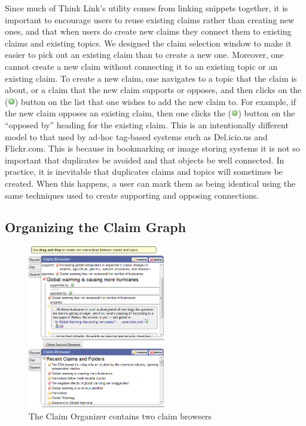 \documentclass{chi2009}
\begin{document}
Since much of Think Link's utility comes from linking snippets together, it is important to encourage users to reuse existing claims rather than creating new ones, and that when users do create new claims they connect them to existing claims and existing topics. We designed the claim selection window to make it easier to pick out an existing claim than to create a new one. Moreover, one cannot create a new claim without connecting it to an existing topic or an existing claim. To create a new claim, one navigates to a topic that the claim is about, or a claim that the new claim supports or opposes, and then clicks on the (\includegraphics[width=0.3cm]{../images/add.png}) button on the list that one wishes to add the new claim to. For example, if the new claim opposes an existing claim, then one clicks the (\includegraphics[width=0.3cm]{../images/add.png}) button on the ``opposed by'' heading for the existing claim. This is an intentionally different model to that used by ad-hoc tag-based systems such as Del.icio.us and Flickr.com. This is because in bookmarking or image storing systems it is not so important that duplicates be avoided and that objects be well connected. In practice, it is inevitable that duplicates claims and topics will sometimes be created. When this happens, a user can mark them as being identical using the same techniques used to create supporting and opposing connections.


\subsection{Organizing the Claim Graph}

\begin{figure}[tb]
	\begin{center}
	\includegraphics[width=6cm]{../screenshots/claimbrowse.png}
	\caption{The Claim Organizer contains two claim browsers}
	\label{fig:claimbrowser}
	\end{center}
\end{figure}
\end{document}
